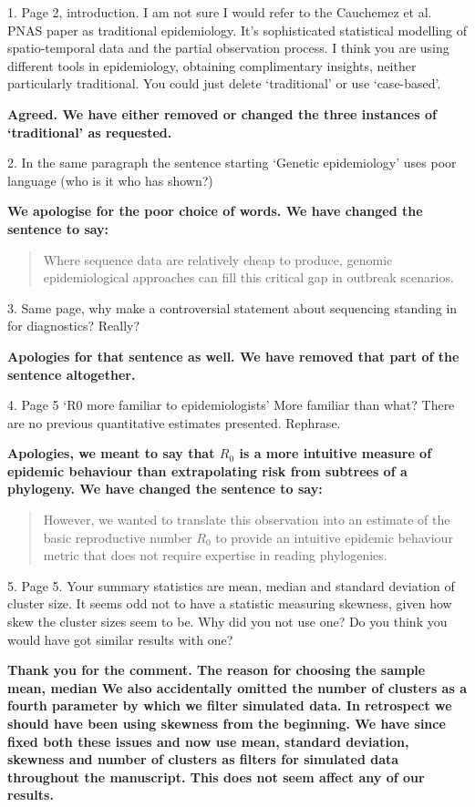 \documentclass[11pt,oneside,letterpaper]{article}
\begin{document}
1. Page 2, introduction. I am not sure I would refer to the Cauchemez et al. PNAS paper as traditional epidemiology. It's sophisticated statistical modelling of spatio-temporal data and the partial observation process. I think you are using different tools in epidemiology, obtaining complimentary insights, neither particularly traditional. You could just delete `traditional' or use `case-based'.

\textbf{Agreed. We have either removed or changed the three instances of `traditional' as requested.}

2. In the same paragraph the sentence starting `Genetic epidemiology' uses poor language (who is it who has shown?)

\textbf{We apologise for the poor choice of words. We have changed the sentence to say:}

\begin{quotation}
Where sequence data are relatively cheap to produce, genomic epidemiological approaches can fill this critical gap in outbreak scenarios.
\end{quotation}

3. Same page, why make a controversial statement about sequencing standing in for diagnostics? Really?

\textbf{Apologies for that sentence as well. We have removed that part of the sentence altogether.}

4. Page 5 `R0 more familiar to epidemiologists' More familiar than what? There are no previous quantitative estimates presented. Rephrase.

\textbf{Apologies, we meant to say that $R_{0}$ is a more intuitive measure of epidemic behaviour than extrapolating risk from subtrees of a phylogeny. We have changed the sentence to say:}

\begin{quotation}
However, we wanted to translate this observation into an estimate of the basic reproductive number $R_{0}$ to provide an intuitive epidemic behaviour metric that does not require expertise in reading phylogenies.
\end{quotation}

5. Page 5. Your summary statistics are mean, median and standard deviation of cluster size. It seems odd not to have a statistic measuring skewness, given how skew the cluster sizes seem to be. Why did you not use one? Do you think you would have got similar results with one?

\textbf{Thank you for the comment.
The reason for choosing the sample mean, median 
We also accidentally omitted the number of clusters as a fourth parameter by which we filter simulated data.
In retrospect we should have been using skewness from the beginning. 
We have since fixed both these issues and now use mean, standard deviation, skewness and number of clusters as filters for simulated data throughout the manuscript.
This does not seem affect any of our results.}
\end{document}
